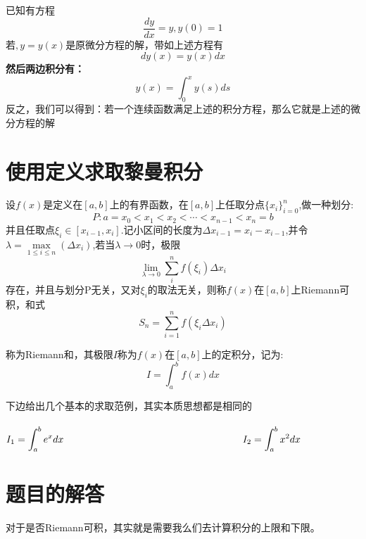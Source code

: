 \documentclass[fontset=windows]{article}
\begin{document}
   已知有方程
   \[
        \frac{dy}{dx}=y, y(0)=1
    \]
   若$,y=y(x)$是原微分方程的解，带如上述方程有
   \[dy(x)=y(x)dx\]
   \textbf{然后两边积分有：}
   \[y(x)=\int_{0}^{x}{y(s) ds}\]
   反之，我们可以得到：若一个连续函数满足上述的积分方程，那么它就是上述的微分方程的解


    \section{使用定义求取黎曼积分}
        \begin{tcolorbox}[colback=blue!5!white,colframe=blue!75!black, title=黎曼和的定义]
            设$f(x)$是定义在$[a,b]$上的有界函数，在$[a, b]$上任取分点$\{x_i\}^n_{i=0}$,做一种划分:
            \[
                P:a=x_0<x_1<x_2<\cdots<x_{n-1}<x_n=b
            \]
            并且任取点$\xi_i\in[x_{i-1},x_i]$.记小区间的长度为$\Delta x_{i-1}=x_i-x_{i-1}$,并令$\lambda=\max\limits_{1\le i\le n}(\Delta x_i)$,若当$\lambda\to 0$时，极限
            \begin{equation}
                \lim\limits_{\lambda\to 0}{\sum_{i}^{n}{f(\xi_i)\Delta x_i}}\nonumber
            \end{equation}
            存在，并且与划分P无关，又对$\xi_i$的取法无关，则称$f(x)$在$[a, b]$上Riemann可积，和式
            \begin{equation}
            S_n= \sum_{i=1}^{n}{f(\xi_i\Delta x_i)}\nonumber
            \end{equation}

            称为Riemann和，其极限$I$称为$f(x)$在$[a, b]$上的定积分，记为:
            \begin{equation}
            I=\int_{a}^{b}{f(x) dx}\nonumber
            \end{equation}
        \end{tcolorbox}
    下边给出几个基本的求取范例，其实本质思想都是相同的\\
    \vspace*{3pt}\\
        \noindent
        $
        \begin{aligned}
            &I_1=\int_{a}^{b}{e^x dx}\hspace*{0.5\linewidth} &I_2= \int_{a}^{b}{x^2 dx}\nonumber   
        \end{aligned} 
        $
    \section{题目的解答}
    对于是否Riemann可积，其实就是需要我么们去计算积分的上限和下限。
\end{document}
